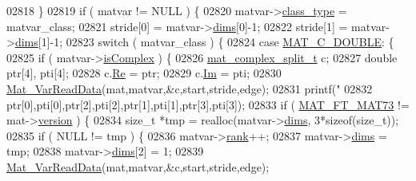 \begin{DoxyCode}
{{{{{{{{02818         \}
02819         \textcolor{keywordflow}{if} ( matvar != NULL ) \{
02820             matvar->\hyperlink{group___m_a_t_aff13035bf3265dd7d9425e5d40c839d4}{class\_type} = matvar\_class;
02821             stride[0] = matvar->\hyperlink{group___m_a_t_a8e01234e1c862ce3472bb37f5a09b92c}{dims}[0]-1;
02822             stride[1] = matvar->\hyperlink{group___m_a_t_a8e01234e1c862ce3472bb37f5a09b92c}{dims}[1]-1;
02823             \textcolor{keywordflow}{switch} ( matvar\_class ) \{
02824                 \textcolor{keywordflow}{case} \hyperlink{group___m_a_t_ggad4d60ae7b709fc81bfd744fb4c857c40a5d70e0862e5bdb7bd86bf7ba5948f307}{MAT\_C\_DOUBLE}: \{
02825                     \textcolor{keywordflow}{if} ( matvar->\hyperlink{group___m_a_t_aeb03b3a69f108dc05470b00443a43739}{isComplex} ) \{
02826                         \hyperlink{group___m_a_t_structmat__complex__split__t}{mat\_complex\_split\_t} c;
02827                         \textcolor{keywordtype}{double} ptr[4], pti[4];
02828                         c.\hyperlink{group___m_a_t_a484a93607508adac2bce53a0252e0325}{Re} = ptr;
02829                         c.\hyperlink{group___m_a_t_a7182d10b0d3598415887376065440946}{Im} = pti;
02830                         \hyperlink{group___m_a_t_ga1845000f4fc6252ec5ff11c4b9f0759f}{Mat\_VarReadData}(mat,matvar,&c,start,stride,edge);
02831                         printf(\textcolor{stringliteral}{"%
02832                             ptr[0],pti[0],ptr[2],pti[2],ptr[1],pti[1],ptr[3],pti[3]);
02833                         \textcolor{keywordflow}{if} ( \hyperlink{group___m_a_t_ggad03442b8378999189d510e3745c702b7a765c5d1d5038947646260dc82483517e}{MAT\_FT\_MAT73} != mat->\hyperlink{struct__mat__t_a729c2bc0afc97485057a5af425635b1a}{version} ) \{
02834                             \textcolor{keywordtype}{size\_t} *tmp = realloc(matvar->\hyperlink{group___m_a_t_a8e01234e1c862ce3472bb37f5a09b92c}{dims}, 3*\textcolor{keyword}{sizeof}(\textcolor{keywordtype}{size\_t}));
02835                             \textcolor{keywordflow}{if} ( NULL != tmp ) \{
02836                                 matvar->\hyperlink{group___m_a_t_a84ba70c96ded13cc555fa75b768d9921}{rank}++;
02837                                 matvar->\hyperlink{group___m_a_t_a8e01234e1c862ce3472bb37f5a09b92c}{dims} = tmp;
02838                                 matvar->\hyperlink{group___m_a_t_a8e01234e1c862ce3472bb37f5a09b92c}{dims}[2] = 1;
02839                                 \hyperlink{group___m_a_t_ga1845000f4fc6252ec5ff11c4b9f0759f}{Mat\_VarReadData}(mat,matvar,&c,start,stride,edge);
}}}}}}}}}
\end{DoxyCode}
